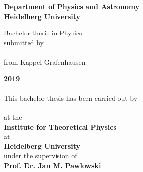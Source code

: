 
\begin{titlepage}
	\begin{center}
		\makeatletter
		\vspace{2cm}
		\Large\textbf{Department of Physics and Astronomy\\
			Heidelberg University}
		
		\vfill
		\normalsize
		Bachelor thesis in Physics\\
		\normalsize
		submitted by\\[0.4cm]
		\Large
		\textbf{\@author}\\[0.4cm]
		\normalsize
		from Kappel-Grafenhausen \\ [1.5cm]
		\Large

		\textbf{2019} \\ %
		\normalsize
		\blankpage
		\thispagestyle{empty}
		\LARGE\textbf{\@title}\\[.4cm]

		\vfill
		\normalsize
		This bachelor thesis has been carried out by \\ 
		\vspace{3pt}
		\textbf{\@author{}}  \\ 
		\vspace{3pt}
		at the\\
		\vspace{3pt}
		\textbf{Institute for Theoretical Physics} \\ at \\\textbf{Heidelberg University}\\
		\vspace{5pt}
		under the supervision of\\
		\vspace{5pt}
		\textbf{Prof. Dr. Jan M. Pawlowski} 
		
		\makeatother
	\end{center}
\blankpage
\end{titlepage}